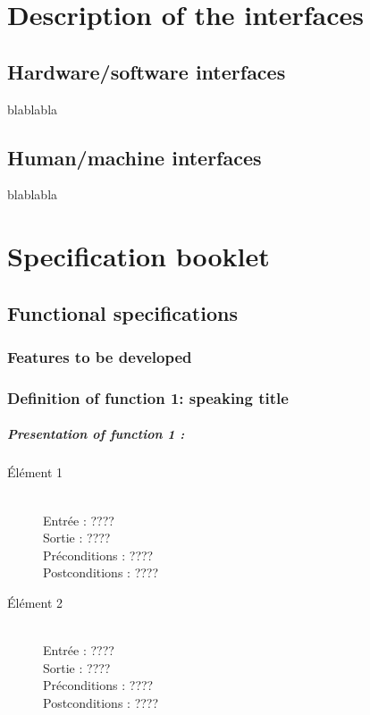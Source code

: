 \documentclass{polytech/polytech}
\numberwithin{figure}{chapter}
\begin{document}
\begin{appendix}
\chapter{Description of the interfaces}

\section{Hardware/software interfaces}

blablabla

\section{Human/machine interfaces}

blablabla

\chapter{Specification booklet}

\section{Functional specifications}

\subsection{Features to be developed}



\subsection{Definition of function 1: speaking title}

\paragraph{Presentation of function 1 :}
 
\begin{description}
    \item[Élément 1] ~ \\
        Entrée : ???? \\
        Sortie : ???? \\
        Préconditions : ???? \\
        Postconditions : ????
    \item[Élément 2] ~ \\
        Entrée : ???? \\
        Sortie : ???? \\
        Préconditions : ???? \\
        Postconditions : ????
\end{description}


\end{appendix}
\end{document}
